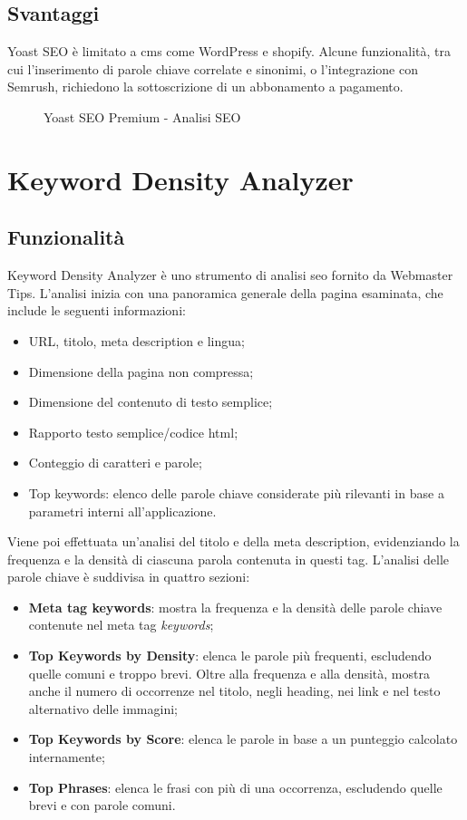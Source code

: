 \subsection{Svantaggi}
\par Yoast SEO è limitato a \gls{cms} come WordPress e \gls{shopify}. Alcune funzionalità, tra cui l'inserimento di parole chiave correlate e sinonimi, o l'integrazione con Semrush, richiedono la sottoscrizione di un abbonamento a pagamento.

\begin{figure}[H]
    \centering 
    \caption{Yoast SEO Premium - Analisi SEO}
\end{figure}

\section{Keyword Density Analyzer}

\subsection{Funzionalità}
\par Keyword Density Analyzer è uno strumento di analisi \gls{seo} fornito da Webmaster Tips. L'analisi inizia con una panoramica generale della pagina esaminata, che include le seguenti informazioni:
\begin{itemize}
    \item URL, titolo, meta description e lingua;
    \item Dimensione della pagina non compressa;
    \item Dimensione del contenuto di testo semplice;
    \item Rapporto testo semplice/codice \gls{html};
    \item Conteggio di caratteri e parole;
    \item Top keywords: elenco delle parole chiave considerate più rilevanti in base a parametri interni all'applicazione.
\end{itemize}
Viene poi effettuata un'analisi del titolo e della meta description, evidenziando la frequenza e la densità di ciascuna parola contenuta in questi tag. L'analisi delle parole chiave è suddivisa in quattro sezioni:
\begin{itemize}
    \item \textbf{Meta tag keywords}: mostra la frequenza e la densità delle parole chiave contenute nel meta tag \textit{keywords};
    \item \textbf{Top Keywords by Density}: elenca le parole più frequenti, escludendo quelle comuni e troppo brevi. Oltre alla frequenza e alla densità, mostra anche il numero di occorrenze nel titolo, negli heading, nei link e nel testo alternativo delle immagini;
    \item \textbf{Top Keywords by Score}: elenca le parole in base a un punteggio calcolato internamente;
    \item \textbf{Top Phrases}: elenca le frasi con più di una occorrenza, escludendo quelle brevi e con parole comuni.
\end{itemize}


